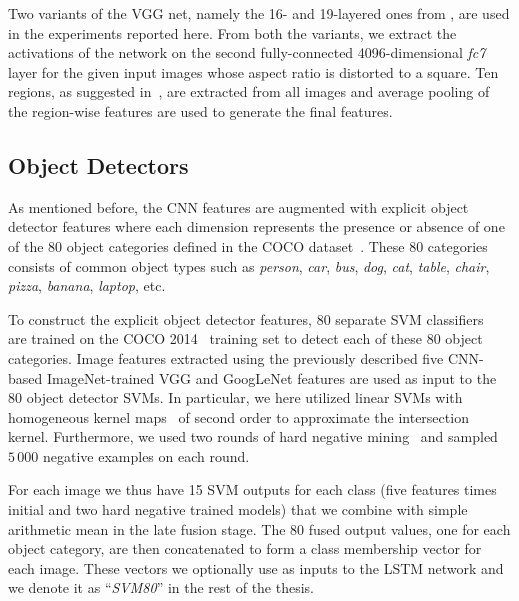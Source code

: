 Two variants of the VGG net, namely the 16- and 19-layered ones from
\cite{Simonyan14c}, are used in the experiments reported here.
From both the variants, we extract the activations of the network on the second
fully-connected 4096-dimensional \emph{fc7} layer for the given input images
whose aspect ratio is distorted to a square.
Ten regions, as suggested in~\cite{Krizhevsky2012}, are extracted from all
images and average pooling of the region-wise features are used to generate the
final features.

\subsection{Object Detectors}
\label{subsec:svm80}

As mentioned before, the CNN features are augmented with explicit object
detector features where each dimension represents the presence or absence of one
of the 80 object categories defined in the COCO dataset~\cite{Lin2014}.
These 80 categories consists of common object types such as \emph{person},
\emph{car}, \emph{bus}, \emph{dog}, \emph{cat}, \emph{table}, \emph{chair},
\emph{pizza}, \emph{banana}, \emph{laptop}, etc.

To construct the explicit object detector features, 80 separate SVM
classifiers~\cite{cortes1995support} are trained on the COCO 2014~\cite{Lin2014}
training set to detect each of these 80 object categories.
Image features extracted using the previously described five CNN-based
ImageNet-trained VGG and GoogLeNet features are used as input to the 80 object
detector SVMs. 
In particular, we here utilized linear SVMs with homogeneous kernel
maps~\cite{Vedaldi2010} of second order to approximate the intersection kernel.
Furthermore, we used two rounds of hard negative mining~\cite{Li2013} and
sampled $5\,000$ negative examples on each round.

For each image we thus have 15 SVM outputs for each class (five features times
initial and two hard negative trained models) that we combine with simple
arithmetic mean in the late fusion stage.
The 80 fused output values, one for each object category, are then concatenated
to form a class membership vector for each image.
These vectors we optionally use as inputs to the LSTM network and we denote it
as ``\emph{SVM80}'' in the rest of the thesis.

